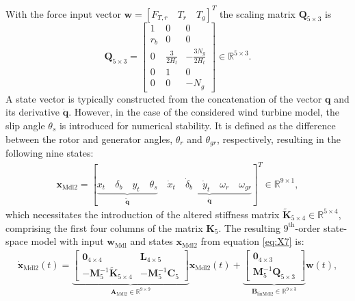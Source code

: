 With the force input vector \(\bm{w}=  [F_{T,r} \quad T_r \quad T_{g} ]^T\) the scaling matrix \(\mathbf{Q}_{5\times3}\) is
\[
\mathbf{Q}_{5\times3} = \begin{bmatrix}
    1 & 0 & 0  \\
    r_b & 0 & 0  \\
    0 & \frac{3}{2H_t} & -\frac{3N_g}{2H_t}\\
    0 & 1 & 0 \\
    0 & 0 & -N_g
\end{bmatrix} \in \mathbb{R}^{5 \times 3}.
\]
%
A state vector is typically constructed from the concatenation of the vector \(\bm{q}\) and its derivative \(\dot{\bm{q}}\). However, in the case of the considered wind turbine model, the slip angle \(\theta_s\) is introduced for numerical stability. It is defined as the difference between the rotor and generator angles, \(\theta_r\) and \(\theta_{gr}\), respectively, resulting in the following nine states:
\begin{align}\label{eq:X7}
    \bm{x}_{\text{Mdl2}} = [\underbrace{x_t \quad \delta_b \quad y_t \quad \theta_s}_{\tilde{\bm{q}}}   \quad \underbrace{\dot{x}_t \quad \dot{\delta}_b \quad \dot{y}_t  \quad {\omega}_r \quad {\omega}_{gr}}_{\dot{\bm{q}}}  ]^T \in \mathbb{R}^{9 \times 1},
\end{align} 
which necessitates the introduction of the altered stiffness matrix \(\tilde{\mathbf{K}}_{5 \times 4} \in \mathbb{R}^{5 \times 4}\), comprising the first four columns of the matrix \(\mathbf{K}_{5}\). The resulting \(9^{\text{th}}\)-order state-space model with input \(\bm{w}_{\text{Mdl}}\) and states \(\bm{x}_{\text{Mdl2}}\) from equation \eqref{eq:X7} is:
\begin{align}\label{eq:7state}
    \dot{\bm{x}}_{\text{Mdl2}}(t) = \underbrace{\begin{bmatrix}
            \bm{0}_{4 \times 4} & \mathbf{L}_{4 \times 5}  \\
            -\mathbf{M}_5^{-1}\tilde{\mathbf{K}}_{5 \times 4} & -\mathbf{M}_5^{-1}\mathbf{C}_5
    \end{bmatrix}}_{\bm{A}_{\text{Mdl2}}  \in \mathbb{R}^{9 \times 9}} \bm{x}_{\text{Mdl2}}(t) + \underbrace{\begin{bmatrix}
            \bm{0}_{4 \times 3} \\
            \mathbf{M}_5^{-1}\mathbf{Q}_{5 \times 3}
    \end{bmatrix}}_{\bm{B}_{\text{linMdl2}}  \in \mathbb{R}^{9 \times 3}} \bm{w}(t),  
\end{align}
